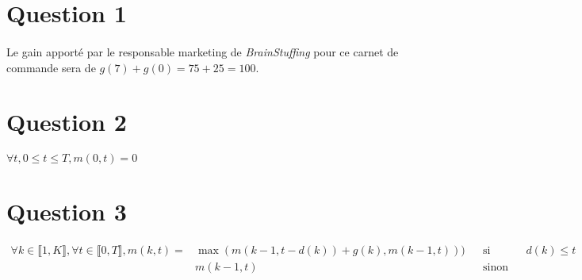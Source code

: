 \documentclass{report}
\begin{document}
\section*{Question 1}

\paragraph{} Le gain apporté par le responsable marketing de
\textit{BrainStuffing} pour ce carnet de commande sera de $g(7) + g(0) = 75 +
25 = 100$.

\section*{Question 2}

\paragraph{} $\forall t, 0 \leq t \leq T, m(0, t) = 0$

\section*{Question 3}

\paragraph{}

\begin{align*}
	\forall k \in \llbracket 1, K\rrbracket, \forall t \in \llbracket 0, T \rrbracket,
		m(k, t) = & \max(m(k-1, t-d(k))+g(k), m(k-1, t))) && \text{si} && d(k) \leq t\\
		          & m(k-1, t)                              && \text{sinon} && \\
\end{align*}






\end{document}
